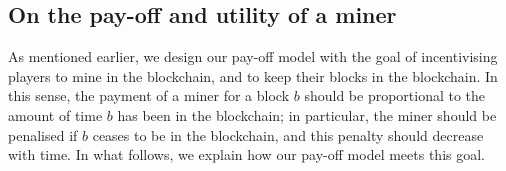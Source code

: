 \subsection{On the pay-off and utility of a miner}
\label{sec-pay-uti}

As mentioned earlier, 
we design our pay-off model with the goal of incentivising players to mine in the blockchain, and to keep their blocks in the blockchain. In this sense, the payment of a miner for a block $b$ should be proportional to the amount of time $b$ has been in the blockchain; in particular, the miner should be penalised if $b$ ceases to be in the blockchain, and this penalty should decrease with time. In what follows, we explain how our pay-off model meets this goal. 

